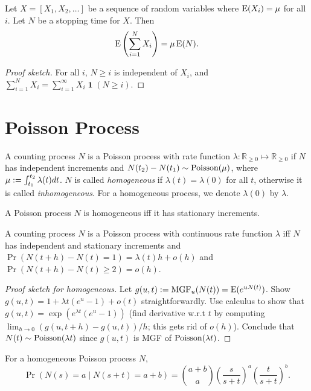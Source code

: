 \documentclass[a4paper, 12pt, fleqn]{article}
\DeclareMathOperator{\boolone}{\mathbf{1}}
\DeclareMathOperator{\MGF}{MGF}
\DeclareMathOperator{\Poisson}{\opname{Poisson}}
\begin{document}
\begin{theorem}
Let $X = [X_1, X_2, \ldots]$ be a sequence of random variables where $\operatorname*{E}(X_i) = \mu$ for all $i$.
Let $N$ be a stopping time for $X$. Then
\[ \operatorname*{E}\left(\sum_{i=1}^N X_i\right) = \mu\operatorname*{E}(N). \]
\end{theorem}
\begin{proof}[Proof sketch]
For all $i$, $N \ge i$ is independent of $X_i$, and
$\displaystyle \sum_{i=1}^N X_i = \sum_{i=1}^{\infty} X_i\boolone(N \ge i)$.
\end{proof}

\section{Poisson Process}

\begin{definition}
A counting process $N$ is a Poisson process with rate function
$\lambda: \mathbb{R}_{\ge 0} \mapsto \mathbb{R}_{\ge 0}$ if
$N$ has independent increments and $N(t_2)-N(t_1) \sim \Poisson(\mu)$,
where $\mu := \int_{t_1}^{t_2} \lambda(t) dt$.
$N$ is called \emph{homogeneous} if $\lambda(t) = \lambda(0)$ for all $t$,
otherwise it is called \emph{inhomogeneous}.
For a homogeneous process, we denote $\lambda(0)$ by $\lambda$.
\end{definition}

\begin{lemma}
A Poisson process $N$ is homogeneous iff it has stationary increments.
\end{lemma}

\begin{theorem}
A counting process $N$ is a Poisson process with continuous rate function $\lambda$ iff
$N$ has independent and stationary increments and
$\Pr(N(t+h)-N(t) = 1) = \lambda(t) h + o(h)$ and $\Pr(N(t+h)-N(t) \ge 2) = o(h)$.
\end{theorem}
\begin{proof}[Proof sketch for homogeneous]
Let $g(u,t) \defeq \MGF_u(N(t)) = \E(e^{uN(t)})$.
Show $g(u,t) = 1 + \lambda t(e^u-1) + o(t)$ straightforwardly.
Use calculus to show that $g(u,t) = \exp(e^{\lambda t}(e^u-1))$
(find derivative w.r.t $t$ by computing $\lim_{h \to 0} (g(u,t+h)-g(u,t))/h$; this gets rid of $o(h)$).
Conclude that $N(t) \sim \Poisson(\lambda t)$ since $g(u,t)$ is MGF of $\Poisson(\lambda t)$.
\end{proof}

\begin{lemma}
For a homogeneous Poisson process $N$,
\[ \Pr(N(s)=a \mid N(s+t)=a+b) = \binom{a+b}{a}\left(\frac{s}{s+t}\right)^a\left(\frac{t}{s+t}\right)^b. \]
\end{lemma}
\end{document}
